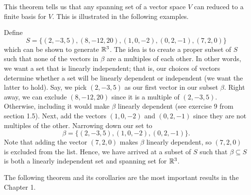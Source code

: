 This theorem tells us that any spanning set of a vector space \( V  \) can reduced to a finite basis for \( V  \). This is illustrated in the following examples.


\begin{eg}
    Define 
    \[  S = \{ (2,-3,5), (8,-12, 20), (1,0,-2), (0,2,-1), (7,2,0) \} \]
    which can be shown to generate \( \mathbb{R}^{3} \). The idea is to create a proper subset of \( S  \) such that none of the vectors in \( \beta \) are a multiples of each other. In other words, we want a set that is linearly independent; that is, our choices of vectors determine whether a set will be linearly dependent or independent (we want the latter to hold). Say, we pick \( (2,-3,5 ) \) as our first vector in our subset \( \beta \). Right away, we can exclude \( (8,-12,20) \) since it is a multiple of \( (2,-3,5) \). Otherwise, including it would make \( \beta \) linearly dependent (see exercise 9 from section 1.5). Next, add the vectors \( (1,0,-2) \) and \( (0,2,-1) \) since they are not multiples of the other. Narrowing down our set to 
    \[  \beta = \{ (2,-3,5), (1,0,-2), (0,2,-1) \}.  \]
    Note that adding the vector \( (7,2,0) \) makes \( \beta \) linearly dependent, so \( (7,2,0) \) is excluded from the list. Hence, we have arrived at a subset of \( S  \) such that \( \beta \subseteq S  \) is both a linearly independent set and spanning set for \( \mathbb{R}^{3}\).
\end{eg}

The following theorem and its corollaries are the most important results in the Chapter 1.


